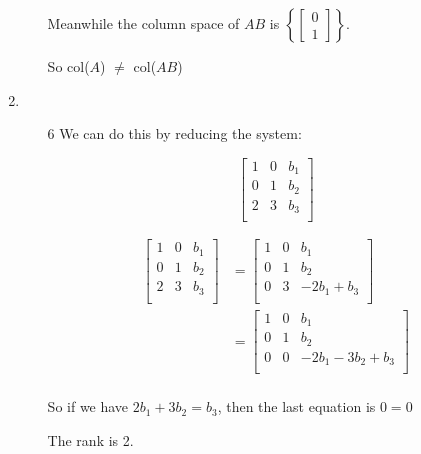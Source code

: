 \documentclass[12pt,letterpaper]{article}
\begin{document}
\begin{enumerate}[label=\S 2.\arabic*]
\begin{enumerate}
          Meanwhile the column space of $AB$ is
          $\left\{\left[\begin{smallmatrix}0 \\ 1\end{smallmatrix}\right]\right\}$.

          So col($A$) $\neq$ col($AB$)
      \end{enumerate}
    \item
      \begin{enumerate}
        \item [6]
          We can do this by reducing the system:

          \[
            \begin{bmatrix}
              1 & 0 & b_1 \\
              0 & 1 & b_2 \\
              2 & 3 & b_3 \\
            \end{bmatrix}
          \]

          \begin{align*}
            \begin{bmatrix}
              1 & 0 & b_1 \\
              0 & 1 & b_2 \\
              2 & 3 & b_3 \\
            \end{bmatrix}
            &=
            \begin{bmatrix}
              1 & 0 & b_1 \\
              0 & 1 & b_2 \\
              0 & 3 & -2b_1 + b_3 \\
            \end{bmatrix}
            \\
            &=
            \begin{bmatrix}
              1 & 0 & b_1 \\
              0 & 1 & b_2 \\
              0 & 0 & -2b_1 - 3b_2 + b_3 \\
            \end{bmatrix}
            \\
          \end{align*}

          So if we have $2b_1 + 3b_2 = b_3$, then the last equation is $0 = 0$

          The rank is 2.


\end{enumerate}
\end{enumerate}
\end{document}

